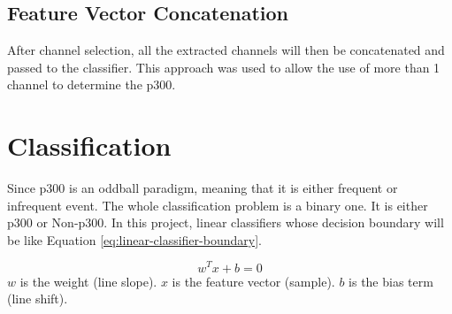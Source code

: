 \subsection{Feature Vector Concatenation}
After channel selection, all the extracted channels will then be concatenated and passed to the classifier. This approach was used to allow the use of more than 1 channel to determine the \ac{p300}.\par
\clearpage



\section{Classification}
Since \ac{p300} is an oddball paradigm, meaning that it is either frequent or infrequent event. The whole classification problem is a binary one. It is either \ac{p300} or Non-\ac{p300}. In this project, linear classifiers whose decision boundary will be like Equation \ref{eq:linear-classifier-boundary}.\par
\begin{equation}
    w^T x + b = 0
    \label{eq:linear-classifier-boundary}
\end{equation}
$w$ is the weight (line slope). $x$ is the feature vector (sample). $b$ is the bias term (line shift).\par
